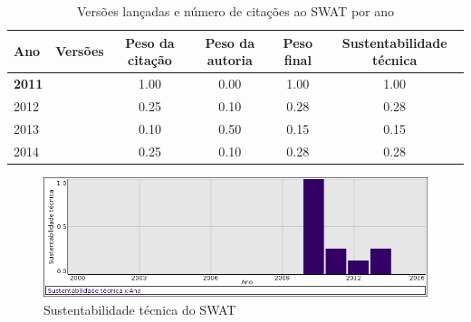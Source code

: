 \begin{table}[H]
\caption{Versões lançadas e número de citações ao SWAT por ano}
\centering
\begin{tabular}{| l | c | c | c | c | c |}
  \hline
  Ano & Versões & Peso da citação & Peso da autoria & Peso final & Sustentabilidade técnica \\
  \hline
            {\bf 2011}
          &
          
          &
          1.00
          &
          0.00
          &
          1.00
          &
            {\color{blue} 1.00}
          \\
\hline
            2012
          &
          
          &
          0.25
          &
          0.10
          &
          0.28
          &
            {\color{red} 0.28}
          \\
\hline
            2013
          &
          
          &
          0.10
          &
          0.50
          &
          0.15
          &
            {\color{red} 0.15}
          \\
\hline
            2014
          &
          
          &
          0.25
          &
          0.10
          &
          0.28
          &
            {\color{red} 0.28}
          \\
\hline
\end{tabular}
\end{table}

\begin{figure}[h]
  \center
  \includegraphics[scale=0.50]{imagens/softwares-charts/swat.png}
  \caption{Sustentabilidade técnica do SWAT}
\end{figure}


